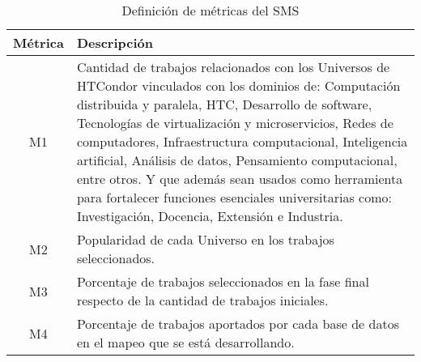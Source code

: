 \begin{table}[H]
	\centering
	\renewcommand{\arraystretch}{1.2} %
	\footnotesize %
	\begin{tabular}{|c|p{13cm}|} %
		\hline
		\textbf{Métrica} & \textbf{Descripción}                                                                                                                                                                                                                                                                                                                                                                                                                                                                                           \\ \hline
		M1               & Cantidad de trabajos relacionados con los Universos de HTCondor vinculados con los dominios de: Computación distribuida y paralela, HTC, Desarrollo de software, Tecnologías de virtualización y microservicios, Redes de computadores, Infraestructura computacional, Inteligencia artificial, Análisis de datos, Pensamiento computacional, entre otros. Y que además sean usados como herramienta para fortalecer funciones esenciales universitarias como: Investigación, Docencia, Extensión e Industria. \\ \hline
		M2               & Popularidad de cada Universo en los trabajos seleccionados.                                                                                                                                                                                                                                                                                                                                                                                                                                                    \\ \hline
		M3               & Porcentaje de trabajos seleccionados en la fase final respecto de la cantidad de trabajos iniciales.                                                                                                                                                                                                                                                                                                                                                                                                           \\ \hline
		M4               & Porcentaje de trabajos aportados por cada base de datos en el mapeo que se está desarrollando.                                                                                                                                                                                                                                                                                                                                                                                                                 \\ \hline
	\end{tabular}
	\caption{Definición de métricas del SMS}
	\label{tab:metricas}
\end{table}

